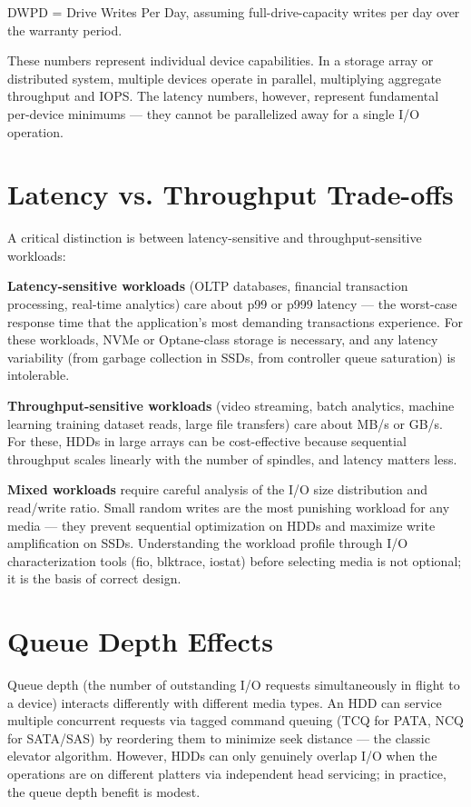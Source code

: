 DWPD = Drive Writes Per Day, assuming full-drive-capacity writes per day over the warranty period.

These numbers represent individual device capabilities. In a storage array or distributed system, multiple devices operate in parallel, multiplying aggregate throughput and IOPS. The latency numbers, however, represent fundamental per-device minimums --- they cannot be parallelized away for a single I/O operation.

\section{Latency vs. Throughput Trade-offs}
A critical distinction is between latency-sensitive and throughput-sensitive workloads:

\textbf{Latency-sensitive workloads} (OLTP databases, financial transaction processing, real-time analytics) care about p99 or p999 latency --- the worst-case response time that the application's most demanding transactions experience. For these workloads, NVMe or Optane-class storage is necessary, and any latency variability (from garbage collection in SSDs, from controller queue saturation) is intolerable.

\textbf{Throughput-sensitive workloads} (video streaming, batch analytics, machine learning training dataset reads, large file transfers) care about MB/s or GB/s. For these, HDDs in large arrays can be cost-effective because sequential throughput scales linearly with the number of spindles, and latency matters less.

\textbf{Mixed workloads} require careful analysis of the I/O size distribution and read/write ratio. Small random writes are the most punishing workload for any media --- they prevent sequential optimization on HDDs and maximize write amplification on SSDs. Understanding the workload profile through I/O characterization tools (fio, blktrace, iostat) before selecting media is not optional; it is the basis of correct design.

\section{Queue Depth Effects}
Queue depth (the number of outstanding I/O requests simultaneously in flight to a device) interacts differently with different media types. An HDD can service multiple concurrent requests via tagged command queuing (TCQ for PATA, NCQ for SATA/SAS) by reordering them to minimize seek distance --- the classic elevator algorithm. However, HDDs can only genuinely overlap I/O when the operations are on different platters via independent head servicing; in practice, the queue depth benefit is modest.

